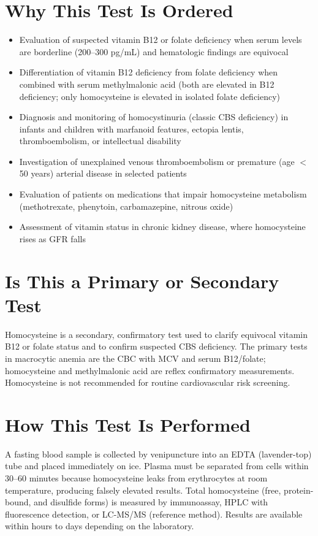 \section*{Why This Test Is Ordered}
\begin{itemize}
  \item Evaluation of suspected vitamin B12 or folate deficiency when serum levels are borderline (200--300 pg/mL) and hematologic findings are equivocal
  \item Differentiation of vitamin B12 deficiency from folate deficiency when combined with serum methylmalonic acid (both are elevated in B12 deficiency; only homocysteine is elevated in isolated folate deficiency)
  \item Diagnosis and monitoring of homocystinuria (classic CBS deficiency) in infants and children with marfanoid features, ectopia lentis, thromboembolism, or intellectual disability
  \item Investigation of unexplained venous thromboembolism or premature (age $<$50 years) arterial disease in selected patients
  \item Evaluation of patients on medications that impair homocysteine metabolism (methotrexate, phenytoin, carbamazepine, nitrous oxide)
  \item Assessment of vitamin status in chronic kidney disease, where homocysteine rises as GFR falls
\end{itemize}
\section*{Is This a Primary or Secondary Test}
Homocysteine is a secondary, confirmatory test used to clarify equivocal vitamin B12 or folate status and to confirm suspected CBS deficiency. The primary tests in macrocytic anemia are the CBC with MCV and serum B12/folate; homocysteine and methylmalonic acid are reflex confirmatory measurements. Homocysteine is not recommended for routine cardiovascular risk screening.
\section*{How This Test Is Performed}
A fasting blood sample is collected by venipuncture into an EDTA (lavender-top) tube and placed immediately on ice. Plasma must be separated from cells within 30--60 minutes because homocysteine leaks from erythrocytes at room temperature, producing falsely elevated results. Total homocysteine (free, protein-bound, and disulfide forms) is measured by immunoassay, HPLC with fluorescence detection, or LC-MS/MS (reference method). Results are available within hours to days depending on the laboratory.
